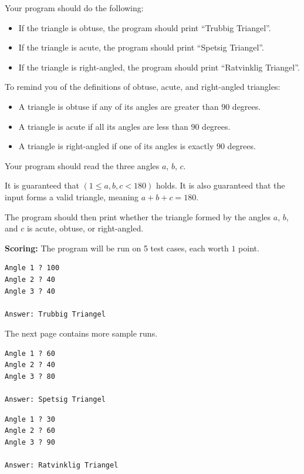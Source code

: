 Your program should do the following:  
\begin{itemize}
  \item If the triangle is obtuse, the program should print ``Trubbig Triangel''.
  \item If the triangle is acute, the program should print ``Spetsig Triangel''.
  \item If the triangle is right-angled, the program should print ``Ratvinklig Triangel''.  
\end{itemize}  

To remind you of the definitions of obtuse, acute, and right-angled triangles:  
\begin{itemize}
  \item A triangle is obtuse if any of its angles are greater than $90$ degrees.  
  \item A triangle is acute if all its angles are less than $90$ degrees.  
  \item A triangle is right-angled if one of its angles is exactly $90$ degrees.  
\end{itemize}  

Your program should read the three angles $a$, $b$, $c$.  

It is guaranteed that $(1 \leq a, b, c < 180)$ holds. It is also guaranteed that the input forms a valid triangle, meaning $a + b + c = 180$.  

The program should then print whether the triangle formed by the angles $a$, $b$, and $c$ is acute, obtuse, or right-angled.  

\textbf{Scoring:} The program will be run on 5 test cases, each worth $1$ point.

\vspace{1cm}
\begin{verbatim}
Angle 1 ? 100
Angle 2 ? 40
Angle 3 ? 40

Answer: Trubbig Triangel
\end{verbatim}
The next page contains more sample runs.

\newpage

\begin{verbatim}
Angle 1 ? 60
Angle 2 ? 40
Angle 3 ? 80

Answer: Spetsig Triangel
\end{verbatim}

\begin{verbatim}
Angle 1 ? 30
Angle 2 ? 60
Angle 3 ? 90

Answer: Ratvinklig Triangel
\end{verbatim}


